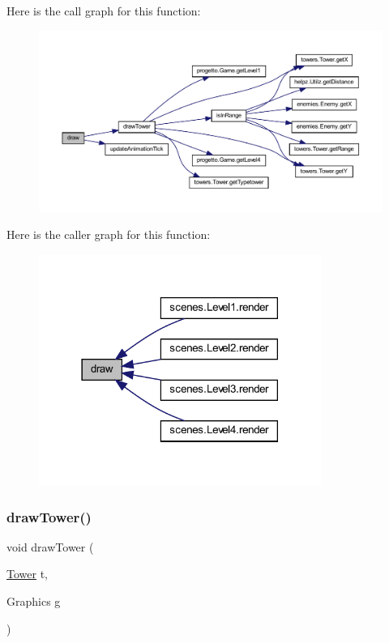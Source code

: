 Here is the call graph for this function\+:\nopagebreak
\begin{figure}[H]
\begin{center}
\leavevmode
\includegraphics[width=350pt]{classmanagers_1_1_tower_manager_a72fe1ffca978e99fd16994a10e7f8051_cgraph}
\end{center}
\end{figure}
Here is the caller graph for this function\+:\nopagebreak
\begin{figure}[H]
\begin{center}
\leavevmode
\includegraphics[width=261pt]{classmanagers_1_1_tower_manager_a72fe1ffca978e99fd16994a10e7f8051_icgraph}
\end{center}
\end{figure}
\mbox{\label{classmanagers_1_1_tower_manager_a2cbe196e347dcc9a69a4d3dfdbec72de}} 
\subsubsection{\texorpdfstring{draw\+Tower()}{drawTower()}}
{\footnotesize\ttfamily void draw\+Tower (\begin{DoxyParamCaption}\item[{\hyperlink{classtowers_1_1_tower}{Tower}}]{t,  }\item[{Graphics}]{g }\end{DoxyParamCaption})\hspace{0.3cm}{\ttfamily [private]}}



